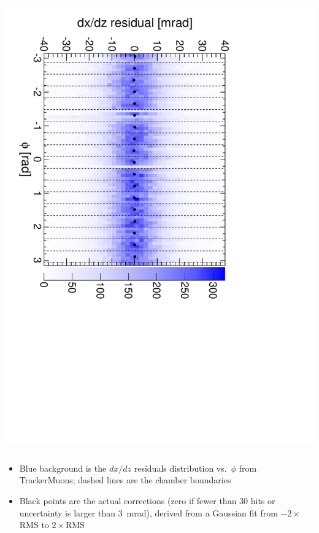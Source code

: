 \documentclass[compress]{beamer}
\begin{document}
\begin{frame}
\begin{columns}
\includegraphics[height=\linewidth, angle=90]{iter02_mep41.pdf}
\end{columns}

\begin{itemize}
\item Blue background is the $dx/dz$ residuals distribution
  vs.\ $\phi$ from TrackerMuons; dashed lines are the chamber boundaries
\item Black points are the actual corrections (zero if fewer than 30
  hits or uncertainty is larger than 3~mrad), derived from a Gaussian
  fit from $-2\times$RMS to $2\times$RMS
\end{itemize}
\end{frame}
\end{document}
